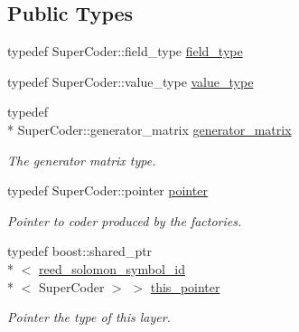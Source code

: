 \subsection*{Public Types}
\begin{DoxyCompactItemize}
\item 
typedef Super\-Coder\-::field\-\_\-type \hyperlink{classkodo_1_1reed__solomon__symbol__id_a4743bd9dd076991ad2bf882b13293d40}{field\-\_\-type}
\begin{DoxyCompactList}\small\item\em \end{DoxyCompactList}\item 
typedef Super\-Coder\-::value\-\_\-type \hyperlink{classkodo_1_1reed__solomon__symbol__id_a86e8c6d7a02eaf6dbd2edde56e4cddad}{value\-\_\-type}
\begin{DoxyCompactList}\small\item\em \end{DoxyCompactList}\item 
\hypertarget{classkodo_1_1reed__solomon__symbol__id_a31ea4775995d9c87abb285734b7ff21a}{typedef \\*
Super\-Coder\-::generator\-\_\-matrix \hyperlink{classkodo_1_1reed__solomon__symbol__id_a31ea4775995d9c87abb285734b7ff21a}{generator\-\_\-matrix}}\label{classkodo_1_1reed__solomon__symbol__id_a31ea4775995d9c87abb285734b7ff21a}

\begin{DoxyCompactList}\small\item\em The generator matrix type. \end{DoxyCompactList}\item 
\hypertarget{classkodo_1_1reed__solomon__symbol__id_a92bde6d579c689ee7d8421c12210893e}{typedef Super\-Coder\-::pointer \hyperlink{classkodo_1_1reed__solomon__symbol__id_a92bde6d579c689ee7d8421c12210893e}{pointer}}\label{classkodo_1_1reed__solomon__symbol__id_a92bde6d579c689ee7d8421c12210893e}

\begin{DoxyCompactList}\small\item\em Pointer to coder produced by the factories. \end{DoxyCompactList}\item 
\hypertarget{classkodo_1_1reed__solomon__symbol__id_a3cd900ee8aefd0bf014290ffb560bf06}{typedef boost\-::shared\-\_\-ptr\\*
$<$ \hyperlink{classkodo_1_1reed__solomon__symbol__id}{reed\-\_\-solomon\-\_\-symbol\-\_\-id}\\*
$<$ Super\-Coder $>$ $>$ \hyperlink{classkodo_1_1reed__solomon__symbol__id_a3cd900ee8aefd0bf014290ffb560bf06}{this\-\_\-pointer}}\label{classkodo_1_1reed__solomon__symbol__id_a3cd900ee8aefd0bf014290ffb560bf06}

\begin{DoxyCompactList}\small\item\em Pointer the type of this layer. \end{DoxyCompactList}\end{DoxyCompactItemize}
